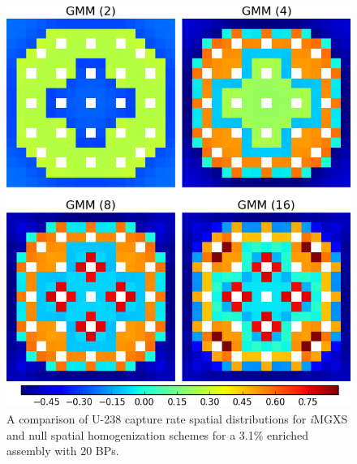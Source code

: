 \begin{figure}[h!]
\centering
\includegraphics[width=0.9\linewidth]{figures/results/compare/assm-31-20BPs/compare-capt}
\vspace{2mm}
\caption[U-238 capture rate comparison for a 3.1\% enriched assembly with 20 BPs]{A comparison of U-238 capture rate spatial distributions for \textit{i}\ac{MGXS} and null spatial homogenization schemes for a 3.1\% enriched assembly with 20 \acp{BP}.}
\label{fig:chap11-assm-31-20BPs-capt-rates-comp}
\end{figure}
	
\clearpage

